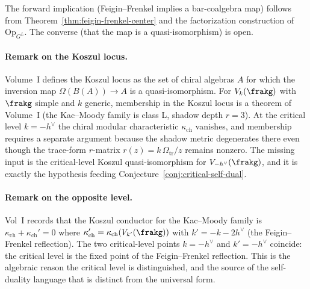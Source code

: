 The forward implication (Feigin--Frenkel implies a bar-coalgebra map) follows from Theorem~\ref{thm:feigin-frenkel-center} and the factorization construction of $\mathrm{Op}_{G^L}$. The converse (that the map is a quasi-isomorphism) is open.

\paragraph{Remark on the Koszul locus.} Volume~I defines the Koszul locus as the set of chiral algebras $A$ for which the inversion map $\Omega(B(A)) \to A$ is a quasi-isomorphism. For $V_k(\frakg)$ with $\frakg$ simple and $k$ generic, membership in the Koszul locus is a theorem of Volume~I (the Kac--Moody family is class L, shadow depth $r = 3$). At the critical level $k = -h^\vee$ the chiral modular characteristic $\kappa_{\mathrm{ch}}$ vanishes, and membership requires a separate argument because the shadow metric degenerates there even though the trace-form $r$-matrix $r(z) = k\,\Omega_{\mathrm{tr}}/z$ remains nonzero. The missing input is the critical-level Koszul quasi-isomorphism for $V_{-h^\vee}(\frakg)$, and it is exactly the hypothesis feeding Conjecture~\ref{conj:critical-self-dual}.

\paragraph{Remark on the opposite level.} Vol~I records that the Koszul conductor for the Kac--Moody family is $\kappa_{\mathrm{ch}} + \kappa_{\mathrm{ch}}' = 0$ where $\kappa_{\mathrm{ch}}' = \kappa_{\mathrm{ch}}(V_{k'}(\frakg))$ with $k' = -k - 2 h^\vee$ (the Feigin--Frenkel reflection). The two critical-level points $k = -h^\vee$ and $k' = -h^\vee$ coincide: the critical level is the fixed point of the Feigin--Frenkel reflection. This is the algebraic reason the critical level is distinguished, and the source of the self-duality language that is distinct from the universal form.

